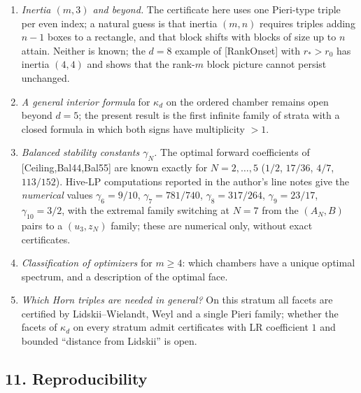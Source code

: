 \documentclass[
  11pt,
  a4paper,
]{article}
\providecommand{\tightlist}{%
  \setlength{\itemsep}{0pt}\setlength{\parskip}{0pt}}
\begin{document}
\begin{enumerate}
\def\labelenumi{\arabic{enumi}.}
\tightlist
\item
  \emph{Inertia \((m,\allowbreak{}3)\) and beyond.} The certificate here uses one
  Pieri-type triple per even index; a natural guess is that inertia
  \((m,\allowbreak{}n)\) requires triples adding \(n-1\) boxes to a rectangle, and
  that block shifts with blocks of size up to \(n\) attain. Neither is
  known; the \(d=8\) example of {[}RankOnset{]} with \(r_*>r_0\) has
  inertia \((4,\allowbreak{}4)\) and shows that the rank-\(m\) block picture cannot
  persist unchanged.
\item
  \emph{A general interior formula} for \(\kappa_d\) on the ordered
  chamber remains open beyond \(d=5\); the present result is the first
  infinite family of strata with a closed formula in which both signs
  have multiplicity \(>1\).
\item
  \emph{Balanced stability constants \(\gamma_N\).} The optimal forward
  coefficients of {[}Ceiling,Bal44,Bal55{]} are known exactly for
  \(N=2,\allowbreak{}\dots,\allowbreak{}5\) (\(1/2\), \(17/36\), \(4/7\), \(113/152\)). Hive-LP
  computations reported in the author's line notes give the
  \emph{numerical} values \(\gamma_6=9/10\), \(\gamma_7=781/740\),
  \(\gamma_8=317/264\), \(\gamma_9=23/17\), \(\gamma_{10}=3/2\), with
  the extremal family switching at \(N=7\) from the \((A_N,\allowbreak{}B)\) pairs to
  a \((u_3,\allowbreak{}z_N)\) family; these are numerical only, without exact
  certificates.
\item
  \emph{Classification of optimizers} for \(m\ge4\): which chambers have
  a unique optimal spectrum, and a description of the optimal face.
\item
  \emph{Which Horn triples are needed in general?} On this stratum all
  facets are certified by Lidskii--Wielandt, Weyl and a single Pieri
  family; whether the facets of \(\kappa_d\) on every stratum admit
  certificates with LR coefficient \(1\) and bounded ``distance from
  Lidskii'' is open.
\end{enumerate}

\subsection{11. Reproducibility}\label{reproducibility}
\end{document}
